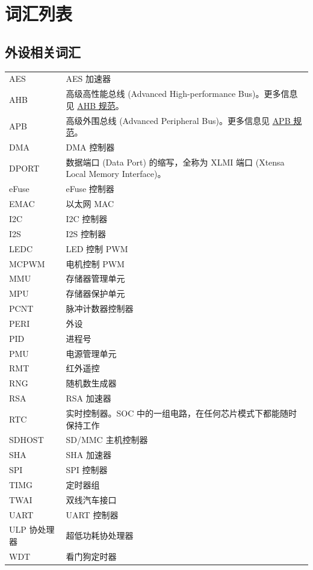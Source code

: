 \section*{词汇列表}\label{glossary}
\rhead{\Navigation}

\subsection*{外设相关词汇}

\begin{longtable}[c]{p{3cm}p{12cm} }
AES & AES 加速器 \\
AHB & 高级高性能总线 (Advanced High-performance Bus)。更多信息见 \href{https://developer.arm.com/documentation/ihi0033/a?lang=en}{AHB 规范}。\\
APB & 高级外围总线 (Advanced Peripheral Bus)。更多信息见 \href{https://developer.arm.com/documentation/ihi0024/b}{APB 规范}。 \\
DMA & DMA 控制器 \\
DPORT & 数据端口 (Data Port) 的缩写，全称为 XLMI 端口 (Xtensa Local Memory Interface)。\\
eFuse & eFuse 控制器 \\
EMAC & 以太网 MAC \\
I2C & I2C 控制器 \\
I2S & I2S 控制器 \\
LEDC & LED 控制 PWM \\
MCPWM & 电机控制 PWM \\
MMU & 存储器管理单元 \\
MPU & 存储器保护单元 \\
PCNT & 脉冲计数器控制器 \\
PERI & 外设 \\
PID & 进程号 \\
PMU & 电源管理单元\\
RMT & 红外遥控 \\
RNG & 随机数生成器 \\
RSA & RSA 加速器 \\
RTC & 实时控制器。SOC 中的一组电路，在任何芯片模式下都能随时保持工作 \\
SDHOST & SD/MMC 主机控制器 \\
SHA & SHA 加速器 \\
SPI & SPI 控制器 \\
TIMG & 定时器组 \\
TWAI & 双线汽车接口 \\ 
UART & UART 控制器 \\
ULP 协处理器 & 超低功耗协处理器\\
WDT & 看门狗定时器 \\

\end{longtable}




